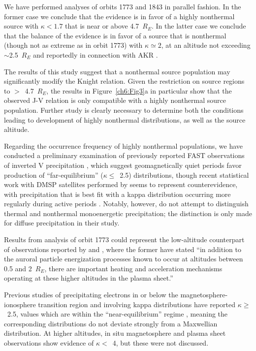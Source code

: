   We have performed analyses of orbits 1773 and 1843 in parallel fashion. In the
  former case we conclude that the evidence is in favor of a highly nonthermal
  source with $\kappa < 1.7$ that is near or above 4.7~$R_E$. In the latter case
  we conclude that the balance of the evidence is in favor of a source that is
  nonthermal (though not as extreme as in orbit 1773) with $\kappa \simeq 2$, at
  an altitude not exceeding $\sim$2.5~$R_E$ and reportedly in connection with
  AKR \citep{Ergun1998}.

  The results of this study suggest that a nonthermal source population may
  significantly modify the Knight relation. Given the restriction on source
  regions to $>$~4.7~$R_E$, the results in Figure~\ref{ch6:Fig3}a in particular
  show that the observed J-V relation is only compatible with a highly
  nonthermal source population. Further study is clearly necessary to determine
  both the conditions leading to development of highly nonthermal distributions,
  as well as the source altitude.

  Regarding the occurrence frequency of highly nonthermal populations, we have
  conducted a preliminary examination of previously reported FAST observations
  of inverted V precipitation
  \citep{McFadden1998a,Carlson2001,Janhunen2001,Dombeck2013}, which suggest
  geomagnetically quiet periods favor production of ``far-equilibrium'' ($\kappa
  \leq$~2.5) distributions, though recent statistical work with DMSP satellites
  performed by \citet{McIntosh2014} seems to represent counterevidence, with
  precipitation that is best fit with a kappa distribution occurring more
  regularly during active periods \citep[e.g., Figure~7
  in][]{McIntosh2014}. Notably, however, \citet{McIntosh2014} do not attempt to
  distinguish thermal and nonthermal monoenergetic precipitation; the
  distinction is only made for diffuse precipitation in their study.

  Results from analysis of orbit 1773 could represent the low-altitude
  counterpart of observations reported by \citet{Wygant2002} and
  \citet{Schriver2003}, where the former have stated ``in addition to the
  auroral particle energization processes known to occur at altitudes between
  0.5 and 2~$R_E$, there are important heating and acceleration mechanisms
  operating at these higher altitudes in the plasma sheet.''

  Previous studies of precipitating electrons in or below the
  magnetosphere-ionosphere transition region and involving kappa distributions
  \citep{Olsson1998,Ogasawara2006,Kaeppler2014a} have reported $\kappa
  \geq$~2.5, values which are within the ``near-equilibrium'' regime
  \citep{Livadiotis2010}, meaning the corresponding distributions do not deviate
  strongly from a Maxwellian distribution. At higher altitudes, in situ
  magnetosphere and plasma sheet observations
  \citet{Christon1989,Christon1991,Kletzing2003} show evidence of $\kappa <$~4,
  but these were not discussed.

